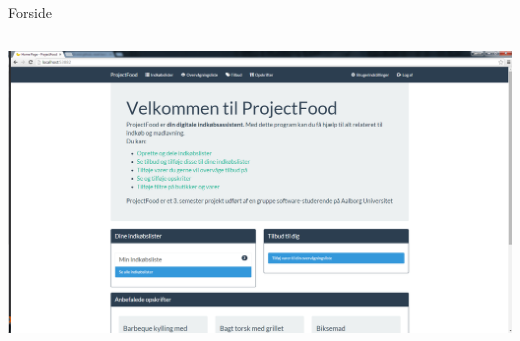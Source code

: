 \begin{frame}{Forside}
	
	\begin{minipage}[0.3\textheight]{\textwidth}
	\begin{columns}[T]
	\begin{column}{1\textwidth}
	 \includegraphics[width=1\textwidth,height=1\textheight,keepaspectratio, trim={1cm 0 0 16mm}, clip]{images/Screenshots/FrontPage.png}
	
	\end{column}

	\end{columns}

  \end{minipage}
	
\end{frame}
